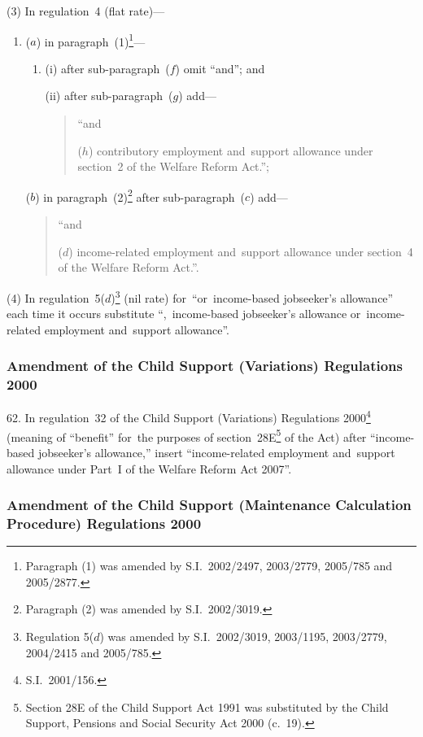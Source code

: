 \documentclass[12pt,a4paper]{article}
\begin{document}
(3) In regulation~4 (flat rate)—
\begin{enumerate}\item[]
($a$) in paragraph~(1)\footnote{Paragraph (1) was amended by S.I.~2002/2497, 2003/2779, 2005/785 and 2005/2877.}—
\begin{enumerate}\item[]
(i) after sub-paragraph~($f$)  omit “and”; and

(ii) after sub-paragraph~($g$)  add—
\begin{quotation}
“and

($h$) contributory employment and~support allowance under section~2 of the Welfare Reform Act.”;
\end{quotation}
\end{enumerate}

($b$) in paragraph~(2)\footnote{Paragraph (2) was amended by S.I.~2002/3019.} after sub-paragraph~($c$)  add—
\begin{quotation}
“and

($d$) income-related employment and~support allowance under section~4 of the Welfare Reform Act.”.
\end{quotation}
\end{enumerate}

(4) In regulation~5($d$)\footnote{Regulation 5($d$) was amended by S.I.~2002/3019, 2003/1195, 2003/2779, 2004/2415 and 2005/785.} (nil rate) for~“or~income-based jobseeker’s allowance” each time it occurs substitute “,~income-based jobseeker’s allowance or~income-related employment and~support allowance”.

\subsubsection[62. Amendment of the Child Support (Variations) Regulations 2000]{Amendment of the Child Support (Variations) Regulations 2000}

62.  In regulation~32 of the Child Support (Variations) Regulations 2000\footnote{S.I.~2001/156.} (meaning of “benefit” for~the purposes of section~28E\footnote{Section 28E of the Child Support Act 1991 was substituted by the Child Support, Pensions and Social Security Act 2000 (c.~19).} of the Act) after “income-based jobseeker’s allowance,” insert “income-related employment and~support allowance under Part~I of the Welfare Reform Act 2007”.

\subsubsection[63. Amendment of the Child Support (Maintenance Calculation Procedure) Regulations 2000]{Amendment of the Child Support (Maintenance Calculation Procedure) Regulations 2000}
\end{document}
